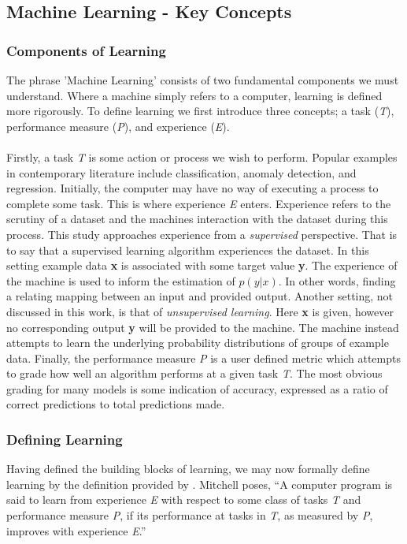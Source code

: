 \subsection{Machine Learning - Key Concepts}
\subsubsection{Components of Learning}
The phrase 'Machine Learning' consists of two fundamental components we must understand. Where a machine simply refers to a computer, learning is defined more rigorously. To define learning we first introduce three concepts; a task (\textit{T}), performance measure (\textit{P}), and experience (\textit{E}).\\ \\
Firstly, a task \textit{T} is some action or process we wish to perform. Popular examples in contemporary literature include classification, anomaly detection, and regression. Initially, the computer may have no way of executing a process to complete some task. This is where experience \textit{E} enters. Experience refers to the scrutiny of a dataset and the machines interaction with the dataset during this process. This study approaches experience from a \textit{supervised} perspective. That is to say that a supervised learning algorithm experiences the dataset. In this setting example data \textbf{x} is associated with some target value \textbf{y}. The experience of the machine is used to inform the estimation of $p(y|x)$. In other words, finding a relating mapping between an input and provided output. Another setting, not discussed in this work, is that of \textit{unsupervised learning}. Here \textbf{x} is given, however no corresponding output \textbf{y} will be provided to the machine. The machine instead attempts to learn the underlying probability distributions of groups of example data. Finally, the performance measure \textit{P} is a user defined metric which attempts to grade how well an algorithm performs at a given task \textit{T}. The most obvious grading for many models is some indication of accuracy, expressed as a ratio of correct predictions to total predictions made.

\subsubsection{Defining Learning}
Having defined the building blocks of learning, we may now formally define learning by the definition provided by \cite{mitchell_97_ML}. Mitchell poses, “A computer program is said to learn from experience \textit{E} with respect to some class of tasks \textit{T} and performance measure \textit{P}, if its performance at tasks in \textit{T}, as measured by \textit{P}, improves with experience \textit{E}.”

